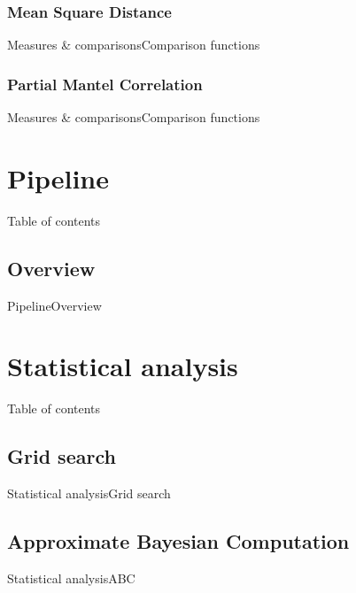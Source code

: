 \documentclass[10pt,aspectratio=43]{beamer}
\begin{document}
\subsubsection{Mean Square Distance}
\begin{frame}{Measures \& comparisons}{Comparison functions}
\end{frame}

\subsubsection{Partial Mantel Correlation}
\begin{frame}{Measures \& comparisons}{Comparison functions}
\end{frame}


\section{Pipeline}
\begin{frame}{}{Table of contents}
\tableofcontents[currentsection, subsectionstyle=show/show/hide]
\end{frame}

\masseyBrand{}{}{}{}
\subsection{Overview}
\begin{frame}{Pipeline}{Overview}
\end{frame}


\section{Statistical analysis}
\begin{frame}{}{Table of contents}
\tableofcontents[currentsection, subsectionstyle=show/show/hide]
\end{frame}

\masseyBrand{}{}{}{}
\subsection{Grid search}
\begin{frame}{Statistical analysis}{Grid search}
\end{frame}

\subsection{Approximate Bayesian Computation}
\begin{frame}{Statistical analysis}{ABC}
\end{frame}
\end{document}
